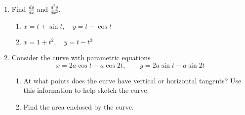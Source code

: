 \begin{enumerate}
\item Find \(\frac{dy}{dx}\) and \(\frac{d^2y}{dx^2}\).
\begin{enumerate}
\item \(x = t + \sin t, \quad y = t-\cos t\) \label{prob4a}%
\item \(x =1 + t^2, \quad y = t-t^3\) \label{prob4b}%
\end{enumerate}

\item Consider the curve with parametric equations
\[
x = 2a\cos t - a\cos 2t, \qquad y = 2a\sin t - a \sin 2t
\]
\begin{enumerate}
\item At what points does the curve have vertical or horizontal tangents? Use this information to help sketch the curve. \label{prob5a}%

\item Find the area enclosed by the curve. \label{prob5b}%
\end{enumerate}


\end{enumerate}
